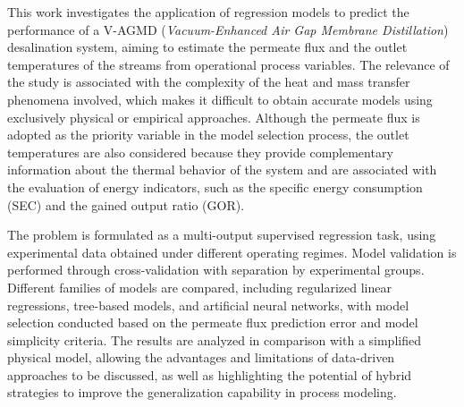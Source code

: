 \begin{foreignabstract}

This work investigates the application of regression models to predict the performance of a V-AGMD (\textit{Vacuum-Enhanced Air Gap Membrane Distillation}) desalination system, aiming to estimate the permeate flux and the outlet temperatures of the streams from operational process variables. The relevance of the study is associated with the complexity of the heat and mass transfer phenomena involved, which makes it difficult to obtain accurate models using exclusively physical or empirical approaches. Although the permeate flux is adopted as the priority variable in the model selection process, the outlet temperatures are also considered because they provide complementary information about the thermal behavior of the system and are associated with the evaluation of energy indicators, such as the specific energy consumption (SEC) and the gained output ratio (GOR).

The problem is formulated as a multi-output supervised regression task, using experimental data obtained under different operating regimes. Model validation is performed through cross-validation with separation by experimental groups. Different families of models are compared, including regularized linear regressions, tree-based models, and artificial neural networks, with model selection conducted based on the permeate flux prediction error and model simplicity criteria. The results are analyzed in comparison with a simplified physical model, allowing the advantages and limitations of data-driven approaches to be discussed, as well as highlighting the potential of hybrid strategies to improve the generalization capability in process modeling.

\end{foreignabstract}

